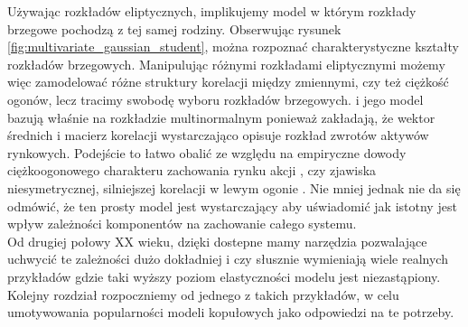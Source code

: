 Używając rozkładów eliptycznych, implikujemy model w którym rozkłady brzegowe pochodzą z tej samej rodziny. Obserwując rysunek \ref{fig:multivariate_gaussian_student}, można rozpoznać charakterystyczne kształty rozkładów brzegowych. Manipulując różnymi rozkładami eliptycznymi możemy więc zamodelować różne struktury korelacji między zmiennymi, czy też ciężkość ogonów, lecz tracimy swobodę wyboru rozkładów brzegowych. \cite{Markovitz_MPT} i jego model bazują właśnie na rozkładzie multinormalnym ponieważ zakładają, że wektor średnich i macierz korelacji wystarczająco opisuje rozkład zwrotów aktywów rynkowych. Podejście to łatwo obalić ze względu na empiryczne dowody ciężkoogonowego charakteru zachowania rynku akcji \cite{Mandelbrot_NonGaussianity}, czy zjawiska niesymetrycznej, silniejszej korelacji w lewym ogonie \cite{Kurowicka_Dependence_Modeling}. Nie mniej jednak nie da się odmówić, że ten prosty model jest wystarczający aby uświadomić jak istotny jest wpływ zależności komponentów na zachowanie całego systemu.\\
Od drugiej połowy XX wieku, dzięki \cite{Sklar_Theorem} dostepne mamy narzędzia pozwalające uchwycić te zależności dużo dokładniej i \cite{Cherubini_Copula_Methods_in_Finance} czy \cite{Kurowicka_Dependence_Modeling} słusznie wymieniają wiele realnych przykładów gdzie taki wyższy poziom elastyczności modelu jest niezastąpiony. Kolejny rozdział rozpoczniemy od jednego z takich przykładów, w celu umotywowania popularności modeli kopułowych jako odpowiedzi na te potrzeby.